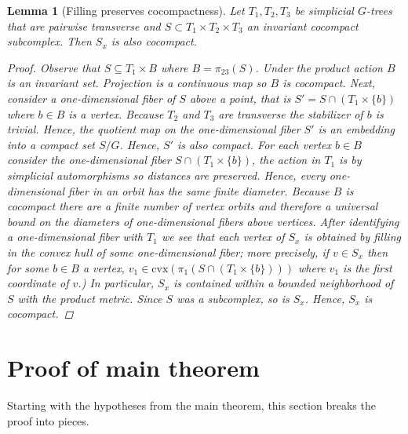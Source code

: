\documentclass[12pt,parskip=full]{report}
\theoremstyle{plain}
\newtheorem{lem}[thm]{Lemma}
\theoremstyle{definition}
\begin{document}
\begin{lem} 
[Filling preserves cocompactness]
\label{lem:fillingcocompact}
    Let $T_1,T_2,T_3$ be simplicial $G$-trees that are pairwise transverse and $S\subset T_1\times T_2\times T_3$ an invariant cocompact subcomplex. Then $S_x$ is also cocompact.
\begin{proof}
    Observe that $S\subseteq T_1\times B$ where $B=\pi_{23}(S)$. Under the product action $B$ is an invariant set. Projection is a continuous map so $B$ is cocompact. Next, consider a one-dimensional fiber of $S$ above a point, that is $S' = S\cap (T_1\times \{b\})$ where $b\in B$ is a vertex. Because $T_2$ and $T_3$ are transverse the stabilizer of $b$ is trivial. Hence, the quotient map on the one-dimensional fiber $S'$ is an embedding into a compact set $S/G$. Hence, $S'$ is also compact. For each vertex $b\in B$ consider the one-dimensional fiber $S\cap (T_1\times \{b\})$, the action in $T_1$ is by simplicial automorphisms so distances are preserved. Hence, every one-dimensional fiber in an orbit has the same finite diameter. Because $B$ is cocompact there are a finite number of vertex orbits and therefore a universal bound on the diameters of one-dimensional fibers above vertices. After identifying a one-dimensional fiber with $T_1$ we see that each vertex of $S_x$ is obtained by filling in the convex hull of some one-dimensional fiber; more precisely, if $v\in S_x$ then for some $b\in B$ a vertex, $v_1\in \text{cvx}(\pi_1(S\cap(T_1\times \{b\})))$ where $v_1$ is the first coordinate of $v$.) In particular, $S_x$ is contained within a bounded neighborhood of $S$ with the product metric. Since $S$ was a subcomplex, so is $S_x$. Hence, $S_x$ is cocompact.
\end{proof}
\end{lem}

\chapter{Proof of main theorem}

Starting with the hypotheses from the main theorem, this section breaks the proof into pieces.
\end{document}
